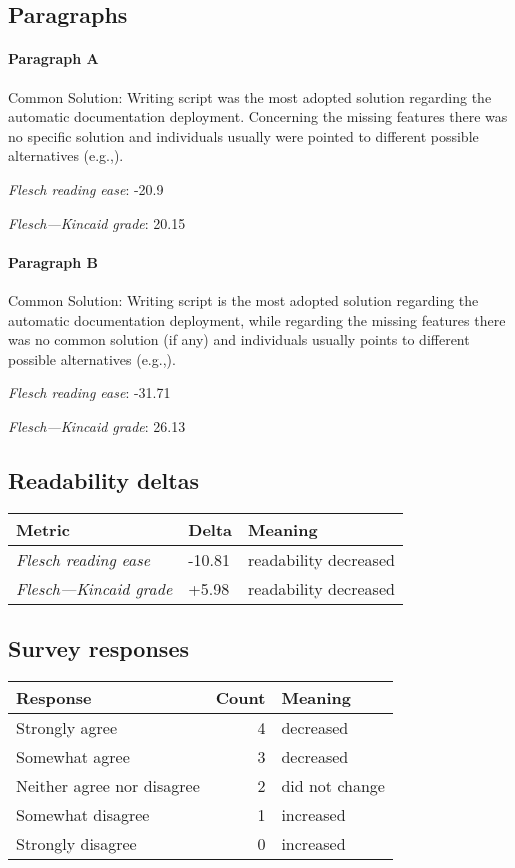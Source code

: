 \subsection{Paragraphs}
\paragraph{Paragraph A}
Common Solution: Writing script was the most adopted solution regarding the automatic documentation deployment. Concerning the missing features there was no specific solution and individuals usually were pointed to different possible alternatives (e.g.,).\par\medskip
\emph{Flesch reading ease}: -20.9\par
\emph{Flesch---Kincaid grade}: 20.15

\paragraph{Paragraph B}
Common Solution: Writing script is the most adopted solution regarding the automatic documentation deployment, while regarding the missing features there was no common solution (if any) and individuals usually points to different possible alternatives (e.g.,).\par\medskip
\emph{Flesch reading ease}: -31.71\par
\emph{Flesch---Kincaid grade}: 26.13

\subsection{Readability deltas}

\begin{tabular}{lll}
\toprule
               \textbf{Metric} & \textbf{Delta} &       \textbf{Meaning} \\
\midrule
    \emph{Flesch reading ease} &         -10.81 &  readability decreased \\
 \emph{Flesch---Kincaid grade} &          +5.98 &  readability decreased \\
\bottomrule
\end{tabular}

\subsection{Survey responses}
\begin{tabular}{lrl}
\toprule
          \textbf{Response} &  \textbf{Count} & \textbf{Meaning} \\
\midrule
             Strongly agree &               4 &        decreased \\
             Somewhat agree &               3 &        decreased \\
 Neither agree nor disagree &               2 &   did not change \\
          Somewhat disagree &               1 &        increased \\
          Strongly disagree &               0 &        increased \\
\bottomrule
\end{tabular}

